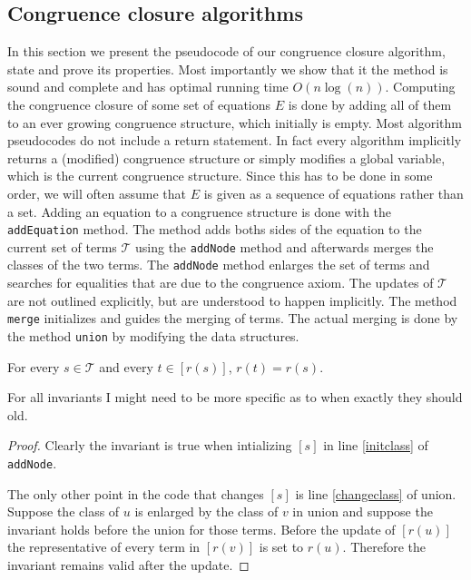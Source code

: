 \FloatBarrier

\subsection*{Congruence closure algorithms}

In this section we present the pseudocode of our congruence closure algorithm, state and prove its properties.
Most importantly we show that it the method is sound and complete and has optimal running time $O(n \log(n))$.
Computing the congruence closure of some set of equations $E$ is done by adding all of them to an ever growing congruence structure, which initially is empty.
Most algorithm pseudocodes do not include a return statement.
In fact every algorithm implicitly returns a (modified) congruence structure or simply modifies a global variable, which is the current congruence structure.
Since this has to be done in some order, we will often assume that $E$ is given as a sequence of equations rather than a set.
Adding an equation to a congruence structure is done with the \texttt{addEquation} method.
The method adds boths sides of the equation to the current set of terms $\mathcal{T}$ using the \texttt{addNode} method and afterwards merges the classes of the two terms.
The \texttt{addNode} method enlarges the set of terms and searches for equalities that are due to the congruence axiom.
The updates of $\mathcal{T}$ are not outlined explicitly, but are understood to happen implicitly.
The method \texttt{merge} initializes and guides the merging of terms.
The actual merging is done by the method \texttt{union} by modifying the data structures.













\begin{invariant}[Class]

For every $s \in \mathcal{T}$ and every $t \in [r(s)]$, $r(t) = r(s)$.

\label{invar:class}
\end{invariant}
{\color{blue} For all invariants I might need to be more specific as to when exactly they should old.}
\begin{proof}

Clearly the invariant is true when intializing $[s]$ in line \ref{initclass} of \texttt{addNode}.

The only other point in the code that changes $[s]$ is line \ref{changeclass} of union.
Suppose the class of $u$ is enlarged by the class of $v$ in union and suppose the invariant holds before the union for those terms.
Before the update of $[r(u)]$ the representative of every term in $[r(v)]$ is set to $r(u)$.
Therefore the invariant remains valid after the update.

\end{proof}

